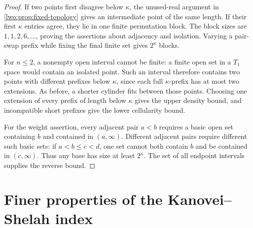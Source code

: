 \documentclass[11pt,a4paper]{article}
\newtheorem{proposition}[theorem]{Proposition}
\theoremstyle{definition}
\theoremstyle{remark}
\newcommand{\W}{\mathcal W}
\begin{document}
\begin{proof}
If two points first disagree below $\kappa$, the unused-real argument in
\cref{lwo:prop:fixed-topology} gives an intermediate point of the same length.
If their first $\kappa$ entries agree, they lie in one finite permutation
block. The block sizes are $1,1,2,6,\ldots$, proving the assertions about
adjacency and isolation. Varying a pair-swap prefix while fixing the final
finite set gives $2^\kappa$ blocks.

For $n\leq2$, a nonempty open interval cannot be finite: a finite open set
in a $T_1$ space would contain an isolated point. Such an interval therefore
contains two points with different prefixes below $\kappa$, since each
full $\kappa$-prefix has at most two extensions. As before, a shorter
cylinder fits between those points. Choosing one extension of every prefix
of length below $\kappa$ gives the upper density bound, and incompatible
short prefixes give the lower cellularity bound.

For the weight assertion, every adjacent pair $a<b$ requires a basic open
set containing $b$ and contained in $(a,\infty)$. Different adjacent pairs
require different such basic sets: if $a<b\leq c<d$, one set cannot both
contain $b$ and be contained in $(c,\infty)$. Thus any base has size at
least $2^\kappa$. The set of all endpoint intervals supplies the reverse
bound.
\end{proof}

\section{Finer properties of the Kanovei--Shelah index}\label{lwo:sec:KS-topology}
\end{document}
